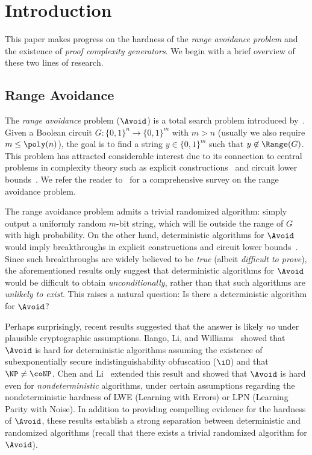 \section{Introduction}







This paper makes progress on the hardness of the \emph{range avoidance problem} and the existence of \emph{proof complexity generators}. We begin with a brief overview of these two lines of research.




\subsection{Range Avoidance}
The \emph{range avoidance} problem ($\Avoid$) is a total search problem introduced by~\cite{KKMP21,Korten21,RenSW22}. Given a Boolean circuit $G: \{0,1\}^n \rightarrow \{0,1\}^m$ with $m > n$ (usually we also require $m\leq\poly(n)$), the goal is to find a string $y \in \{0,1\}^m$ such that $y \not\in \Range(G)$. This problem has attracted considerable interest due to its connection to central problems in complexity theory such as explicit constructions~\cite{Korten21, RenSW22, ChenHLR23, GuruswamiLW22, GajulapalliGNS23} and circuit lower bounds~\cite{Korten21, CHR24, Li24, KortenP24}. We refer the reader to~\cite{Korten-EATCS} for a comprehensive survey on the range avoidance problem. %

The range avoidance problem admits a trivial randomized algorithm: simply output a uniformly random $m$-bit string, which will lie outside the range of $G$ with high probability. On the other hand, deterministic algorithms for $\Avoid$ would imply breakthroughs in explicit constructions and circuit lower bounds~\cite{Korten21, RenSW22, GuruswamiLW22, GajulapalliGNS23}. Since such breakthroughs are widely believed to be \emph{true} (albeit \emph{difficult to prove}), the aforementioned results only suggest that deterministic algorithms for $\Avoid$ would be difficult to obtain \emph{unconditionally}, rather than that such algorithms are \emph{unlikely to exist}. This raises a natural question: Is there a deterministic algorithm for $\Avoid$?

Perhaps surprisingly, recent results suggested that the answer is likely \emph{no} under plausible cryptographic assumptions. Ilango, Li, and Williams~\cite{DBLP:conf/stoc/IlangoLW23} showed that $\Avoid$ is hard for deterministic algorithms assuming the existence of subexponentially secure indistinguishability obfuscation ($\iO$) and that $\NP\neq \coNP$. Chen and Li~\cite{DBLP:conf/stoc/ChenL24} extended this result and showed that $\Avoid$ is hard even for \emph{nondeterministic} algorithms, under certain assumptions regarding the nondeterministic hardness of LWE (Learning with Errors) or LPN (Learning Parity with Noise). In addition to providing compelling evidence for the hardness of $\Avoid$, these results establish a strong separation between deterministic and randomized algorithms (recall that there exists a trivial randomized algorithm for $\Avoid$). %

